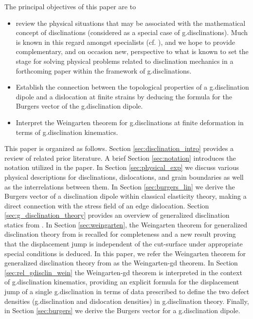 \documentclass[11pt,letterpaper]{article}
\begin{document}
The principal objectives of this paper are to
\begin{itemize}
\item  review the physical situations that  may be associated with the mathematical concept of disclinations (considered as a special case of g.disclinations). Much is known in this regard amongst specialists (cf. \cite{romanov2009application}), and we hope to provide complementary, and on occasion new, perspective to what is known to set the stage for solving physical problems related to disclination mechanics in a forthcoming paper \cite{zhang_acharya_puri} within the framework of g.disclinations.
\item Establish the connection between the topological properties of a g.disclination dipole and a dislocation at finite strains by deducing the formula for the Burgers vector of the g.disclination dipole.
\item Interpret the Weingarten theorem for g.disclinations at finite deformation \cite{acharya2015continuum} in terms of g.disclination kinematics.
\end{itemize}

This paper is organized as follows. Section \ref{sec:disclination_intro} provides a review of related prior literature. A brief Section \ref{sec:notation} introduces the notation utilized in the paper. In Section \ref{sec:physical_exp} we discuss various physical descriptions for disclinations, dislocations, and grain boundaries as well as the interrelations between them. In Section \ref{sec:burgers_lin} we derive the Burgers vector of a disclination dipole within classical elasticity theory, making a direct connection with the stress field of an edge dislocation. Section \ref{sec:g_disclination_theory} provides an overview of generalized disclination statics from \cite{acharya2015continuum}. In Section \ref{sec:weingarten}, the Weingarten theorem for generalized disclination theory from \cite{acharya2015continuum} is recalled for completeness and a new result proving that the displacement jump is independent of the cut-surface under appropriate special conditions is deduced. In this paper, we refer the Weingarten theorem for generalized disclination theory from \cite{acharya2015continuum} as the Weingarten-gd theorem. In Section \ref{sec:rel_gdisclin_wein} the Weingarten-gd theorem is interpreted in the context of g.disclination kinematics, providing an explicit formula for the displacement jump of a single g.disclination in terms of data prescribed to define the two defect densities (g.disclination and dislocation densities) in g.disclination theory. Finally, in Section \ref{sec:burgers} we derive the Burgers vector for a g.disclination dipole.
\end{document}

